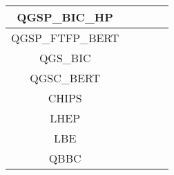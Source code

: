 \documentclass[11pt]{article}
\begin{document}
\begin{center}
\begin{tabular}{|c|c|c|c|c|}
  \hline                                                                        
  QGSP\_BIC\_HP        &             &              &            &              \\
  \hline                                                                        
  \hline                                                                        
  QGSP\_FTFP\_BERT     &             &              &            &              \\
  \hline                                                                        
  \hline                                                                        
  QGS\_BIC             &             &              &            &              \\
  \hline                                                                        
  \hline                                                                        
  QGSC\_BERT           &             &              &            &              \\
  \hline                                                                        
  \hline                                                                        
  CHIPS                &             &              &            &              \\
  \hline                                                                        
  \hline                                                                        
  LHEP                 &             &              &            &              \\
  \hline                                                                        
  \hline                                                                        
  LBE                  &             &              &            &              \\
  \hline                                                                        
  \hline                                                                        
  QBBC                 &             &              &            &              \\
  \hline
\end{tabular}
\end{center}
\end{document}
